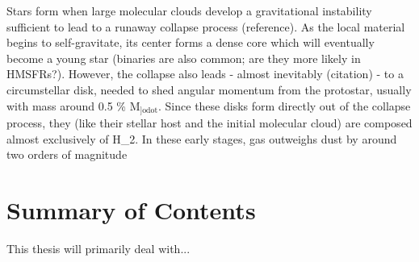 Stars form when large molecular clouds develop a gravitational instability sufficient to lead to a runaway collapse process (reference). As the local material begins to self-gravitate, its center forms a dense core which will eventually become a young star (binaries are also common; are they more likely in HMSFRs?). However, the collapse also leads - almost inevitably (citation) - to a circumstellar disk, needed to shed angular momentum from the protostar, usually with mass around 0.5 \% M$_{\text{]odot}}$. Since these disks form directly out of the collapse process, they (like their stellar host and the initial molecular cloud) are composed almost exclusively of H_2. In these early stages, gas outweighs dust by around two orders of magnitude





\section{Summary of Contents}
This thesis will primarily deal with...
\fi
